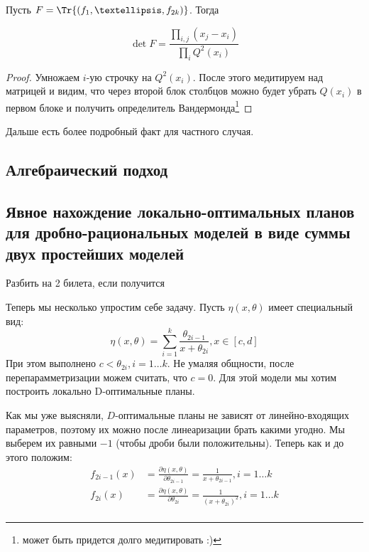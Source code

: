 Пусть $F = \Tr{(f_1, …, f_{2k})}$. Тогда 
\begin{thm}
\begin{equation}
\label{rationModelDet}
\det F = \frac{\prod\limits_{i,j} (x_j - x_i)}{\prod\limits_{i} Q^2(x_i)}
\end{equation}
\end{thm}
\begin{proof}
Умножаем  $i$-ую строчку на $Q^2(x_i)$. После этого медитируем над матрицей и видим, что через второй блок столбцов можно будет убрать $Q(x_i)$ в первом блоке и получить определитель Вандермонда\footnote{может быть придется долго медитировать :)}
\end{proof}

{\color{blue} Дальше есть более подробный факт для частного случая. }

\subsection{Алгебраический подход}
\subsection{Явное нахождение локально-оптимальных планов для дробно-рациональных моделей в виде суммы двух простейших моделей}

{\color{blue} Разбить на 2 билета, если получится}

Теперь мы несколько упростим себе задачу. Пусть $\eta(x, \theta)$ имеет специальный вид:
\begin{equation}
\label{simplRatModel}
\eta(x,\theta) = \sum\limits_{i=1}^{k} \frac{\theta_{2i-1}}{x+\theta_{2i}}, x\in[c,d]
\end{equation}
При этом выполнено $c < \theta_{2i}, i=1…k$. Не умаляя общности, после перепарамметризации можем считать,  что $c=0$. Для этой модели мы хотим построить локально D-оптимальные планы.

Как мы уже выясняли, $D$-оптимальные планы не зависят от линейно-входящих параметров, поэтому их можно после линеаризации брать какими угодно. Мы выберем их равными $-1$ (чтобы дроби были положительны). Теперь как и до этого положим:
\begin{align*}
f_{2i-1}(x) &= \frac{\partial \eta(x, \theta)}{\partial{\theta_{2i-1}}} = \frac{1}{x+\theta_{2i-1}}, i =1 … k \\
f_{2i}(x) &= \frac{\partial \eta(x, \theta)}{\partial{\theta_{2i}}} = \frac{1}{(x+\theta_{2i})^2}, i =1…k\\
\end{align*}

